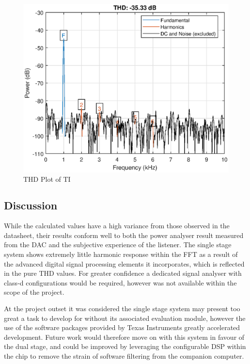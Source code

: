 \documentclass[main.tex]{subfiles}
\begin{document}
\begin{figure}[H]
    \centering
    \includegraphics[scale=0.75]{./figs/tiTHDPlot.eps}        
    \caption{THD Plot of TI}
    \label{fig:ti-thd}
\end{figure}

\subsection{Discussion}

While the calculated values have a high variance from those observed in the datasheet, their results conform well to both the power analyser result measured from the DAC and the subjective experience of the listener. The single stage system shows extremely little harmonic response within the FFT as a result of the advanced digital signal processing elements it incorporates, which is reflected in the pure THD values. For greater confidence a dedicated signal analyser with class-d configurations would be required, however was not available within the scope of the project. 
\par 
At the project outset it was considered the single stage system may present too great a task to develop for without its associated evaluation module, however the use of the software packages provided by Texas Instruments greatly accelerated development. Future work would therefore move on with this system in favour of the dual stage, and could be improved by leveraging the configurable DSP within the chip to remove the strain of software filtering from the companion computer.
\end{document}
